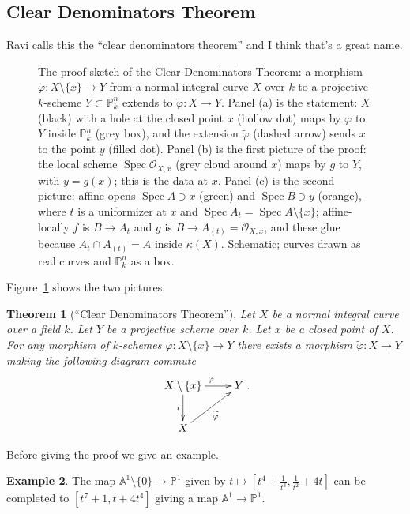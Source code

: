 \documentclass[12pt]{article}
\numberwithin{equation}{section}
\newtheorem{theorem}{Theorem}[subsection]
\theoremstyle{definition}
\newtheorem{example}[theorem]{Example}
\theoremstyle{remark}
\newcommand{\Ocal}{\mathcal{O}}
\newcommand{\PP}{\mathbb{P}}
\renewcommand{\AA}{\mathbb{A}}
\newcommand{\Spec}{\operatorname{Spec}}
\begin{document}
\subsection{Clear Denominators Theorem}
Ravi calls this the ``clear denominators theorem'' and I think that's a great name.  
\begin{figure}[H]
\centering

\caption{The proof sketch of the Clear Denominators Theorem: a morphism $\varphi:X\setminus\{x\}\to Y$ from a normal integral curve $X$ over $k$ to a projective $k$-scheme $Y\subset\PP^n_k$ extends to $\widetilde\varphi:X\to Y$. Panel (a) is the statement: $X$ (black) with a hole at the closed point $x$ (hollow dot) maps by $\varphi$ to $Y$ inside $\PP^n_k$ (grey box), and the extension $\widetilde\varphi$ (dashed arrow) sends $x$ to the point $y$ (filled dot). Panel (b) is the first picture of the proof: the local scheme $\Spec\Ocal_{X,x}$ (grey cloud around $x$) maps by $g$ to $Y$, with $y=g(x)$; this is the data at $x$. Panel (c) is the second picture: affine opens $\Spec A\ni x$ (green) and $\Spec B\ni y$ (orange), where $t$ is a uniformizer at $x$ and $\Spec A_t=\Spec A\setminus\{x\}$; affine-locally $f$ is $B\to A_t$ and $g$ is $B\to A_{(t)}=\Ocal_{X,x}$, and these glue because $A_t\cap A_{(t)}=A$ inside $\kappa(X)$. Schematic; curves drawn as real curves and $\PP^n_k$ as a box.}\label{fig:clear-denominators}
\end{figure}
Figure~\ref{fig:clear-denominators} shows the two pictures.

\begin{theorem}[``Clear Denominators Theorem'']
	Let $X$ be a normal integral curve over a field $k$.
	Let $Y$ be a projective scheme over $k$.
	Let $x$ be a closed point of $X$.
	For any morphism of $k$-schemes $\varphi: X\setminus\lbrace x \rbrace \to Y$ there exists a morphism $\widetilde{\varphi}:X \to Y$ making the following diagram commute
	$$\xymatrix{
		X \setminus \lbrace x \rbrace \ar[r]^{\varphi} \ar[d]_{i} & Y\\
		X\ar[ur]_{\widetilde{\varphi}} & 
	}.$$
\end{theorem}
Before giving the proof we give an example. 
\begin{example}
	The map $\AA^1\setminus \lbrace 0 \rbrace \to \PP^1$ given by $t \mapsto [t^4+\frac{1}{t^3}, \frac{1}{t^2}+4t]$ can be completed to $[t^7+1, t+4t^4]$ giving a map $\AA^1 \to \PP^1$.
\end{example}
\end{document}
